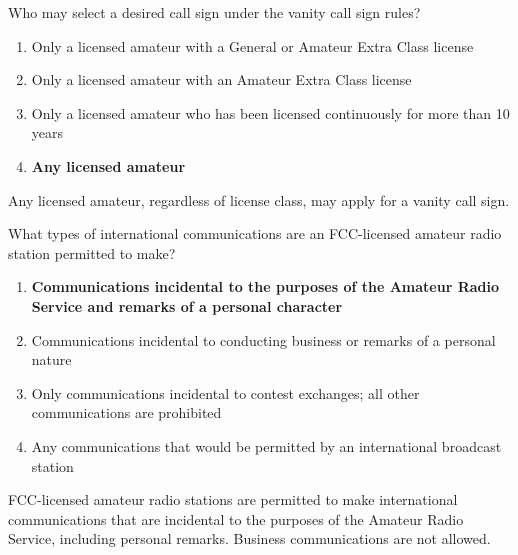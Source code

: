 
\begin{tcolorbox}[colback=gray!10!white,colframe=black!75!black,title={T1C02}]
    Who may select a desired call sign under the vanity call sign rules?
    \begin{enumerate}[label=\Alph*,noitemsep]
        \item Only a licensed amateur with a General or Amateur Extra Class license
        \item Only a licensed amateur with an Amateur Extra Class license
        \item Only a licensed amateur who has been licensed continuously for more than 10 years
        \item \textbf{Any licensed amateur}
    \end{enumerate}
\end{tcolorbox}
Any licensed amateur, regardless of license class, may apply for a vanity call sign.


\begin{tcolorbox}[colback=gray!10!white,colframe=black!75!black,title={T1C03}]
    What types of international communications are an FCC-licensed amateur radio station permitted to make?
    \begin{enumerate}[label=\Alph*,noitemsep]
        \item \textbf{Communications incidental to the purposes of the Amateur Radio Service and remarks of a personal character}
        \item Communications incidental to conducting business or remarks of a personal nature
        \item Only communications incidental to contest exchanges; all other communications are prohibited
        \item Any communications that would be permitted by an international broadcast station
    \end{enumerate}
\end{tcolorbox}
FCC-licensed amateur radio stations are permitted to make international communications that are incidental to the purposes of the Amateur Radio Service, including personal remarks. Business communications are not allowed.



